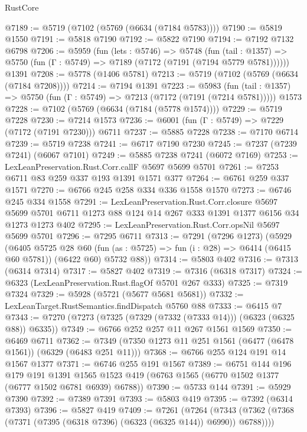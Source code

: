 \begin{lexlean}{RustCore}
\begin{coremodule}
@7189 := @5719 (@7102 (@5769 (@6634 (@7184 @5783))))
@7190 := @5819 @1550
@7191 := @5818 @7190
@7192 := @5822 @7190
@7194 := @7192 @7132 @6798
@7206 := @5959
    (fun (lets : @5746) =>
    @5748
      (fun (tail : @1357) => @5750 (fun (Γ : @5749) => @7189 (@7172 (@7191 (@7194 @5779 @5781))))))
    @1391
@7208 := @5778 (@1406 @5781)
@7213 := @5719 (@7102 (@5769 (@6634 (@7184 @7208))))
@7214 := @7194 @1391
@7223 := @5983
    (fun (tail : @1357) => @5750 (fun (Γ : @5749) => @7213 (@7172 (@7191 (@7214 @5781)))))
    @1573
@7228 := @7102 (@5769 (@6634 (@7184 (@5778 @1574))))
@7229 := @5719 @7228
@7230 := @7214 @1573
@7236 := @6001 (fun (Γ : @5749) => @7229 (@7172 (@7191 @7230))) @6711
@7237 := @5885 @7228
@7238 := @7170 @6714
@7239 := @5719 @7238
@7241 := @6717 @7190 @7230
@7245 := @7237 (@7239 @7241) (@6067 @7101)
@7249 := @5885 @7238 @7241 (@6072 @7169)
@7253 := LexLeanPreservation.Rust.Corr.callF @5697 @5699 @5701
@7261 := @7253 @6711 @83 @259 @337 @193 @1391 @1571 @377
@7264 := @6761 @259 @337 @1571
@7270 := @6766 @245 @258 @334 @336 @1558 @1570
@7273 := @6746 @245 @334 @1558
@7291 := LexLeanPreservation.Rust.Corr.closure
    @5697
    @5699
    @5701
    @6711
    @1273
    @88
    @124
    @14
    @267
    @333
    @1391
    @1377
    @6156
    @34
    @1273
    @1273
    @402
@7295 := LexLeanPreservation.Rust.Corr.opsNil @5697 @5699 @5701
@7296 := @7295 @6711
@7313 := @7291
    (@7296 @1273)
    (@5929
      (@6405
        @5725
        @28
        @60
        (fun (as : @5725) => fun (i : @28) => @6414 (@6415 @60 @5781))
        (@6422 @60)
        @5732
        @88))
@7314 := @5803 @402
@7316 := @7313 (@6314 @7314)
@7317 := @5827 @402
@7319 := @7316 (@6318 @7317)
@7324 := @6323 (LexLeanPreservation.Rust.flagOf @5701 @267 @333)
@7325 := @7319 @7324
@7329 := @5928 (@5721 (@5677 @5681 @5681))
@7332 := LexLeanTarget.RustSemantics.findDispatch @5760 @88
@7333 := @6415 @7
@7343 := @7270 (@7273 (@7325 (@7329 (@7332 (@7333 @14))) (@6323 (@6325 @88)) @6335))
@7349 := @6766 @252 @257 @11 @267 @1561 @1569
@7350 := @6469 @6711
@7362 := @7349 (@7350 @1273 @11 @251 @1561 (@6477 (@6478 @1561)) (@6329 (@6483 @251 @11)))
@7368 := @6766 @255 @124 @191 @14 @1567 @1377
@7371 := @6746 @255 @191 @1567
@7389 := @6751
    @144
    @196
    @179
    @191
    @1391
    @1565
    @1523
    @419
    (@6763 @1565 (@6770 @1502 @1377 (@6777 @1502 @6781 @6939) @6788))
@7390 := @5733 @144
@7391 := @5929 @7390
@7392 := @7389 @7391
@7393 := @5803 @419
@7395 := @7392 (@6314 @7393)
@7396 := @5827 @419
@7409 := @7261
    (@7264 (@7343 (@7362 (@7368 (@7371 (@7395 (@6318 @7396) (@6323 (@6325 @144)) @6990)) @6788))))

\end{coremodule}
\end{lexlean}

